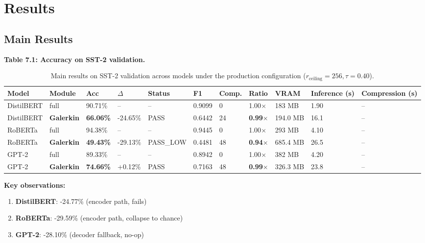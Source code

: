 
\section{Results}

\subsection{Main Results}

\textbf{Table 7.1: Accuracy on SST-2 validation.}

\begin{table}[t]
\centering
\small
\begin{tabular}{lllllllllll}
\toprule
\textbf{Model} & \textbf{Module} & \textbf{Acc} & \textbf{$\Delta$} & \textbf{Status} & \textbf{F1} & \textbf{Comp.} & \textbf{Ratio} & \textbf{VRAM} & \textbf{Inference (s)} & \textbf{Compression (s)} \\
\midrule
DistilBERT & full & 90.71\% & -- & -- & 0.9099 & 0 & 1.00$\times$ & 183 MB & 1.90 & -- \\
DistilBERT & \textbf{Galerkin} & \textbf{66.06\%} & -24.65\% & PASS & 0.6442 & 24 & \textbf{0.99$\times$} & 194.0 MB & 16.1 & -- \\
RoBERTa & full & 94.38\% & -- & -- & 0.9445 & 0 & 1.00$\times$ & 293 MB & 4.10 & -- \\
RoBERTa & \textbf{Galerkin} & \textbf{49.43\%} & -29.13\% & PASS_LOW & 0.4481 & 48 & \textbf{0.94$\times$} & 685.4 MB & 26.5 & -- \\
GPT-2 & full & 89.33\% & -- & -- & 0.8942 & 0 & 1.00$\times$ & 382 MB & 4.20 & -- \\
GPT-2 & \textbf{Galerkin} & \textbf{74.66\%} & +0.12\% & PASS & 0.7163 & 48 & \textbf{0.99$\times$} & 326.3 MB & 23.8 & -- \\
\bottomrule
\end{tabular}
\caption{Main results on SST-2 validation across models under the production configuration ($r_{\mathrm{ceiling}}=256, \tau=0.40$).}
\label{tab:main_sst2}
\end{table}

\textbf{Key observations:}

\begin{enumerate}
\item \textbf{DistilBERT}: -24.77\% (encoder path, fails)
\item \textbf{RoBERTa}: -29.59\% (encoder path, collapse to chance)
\item \textbf{GPT-2}: -28.10\% (decoder fallback, no-op)

\end{enumerate}
